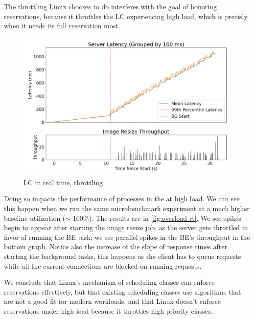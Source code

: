 The throttling Linux chooses to do interferes with the goal of honoring
reservations, because it throttles the LC experiencing high load, which is
precisly when it needs its full reservation  most.


\begin{figure}[t]
    \centering
    \includegraphics[width=\columnwidth]{graphs/overload-rt.png}
    \caption{LC in real time, throttling}\label{fig:overload-rt}
\end{figure}

Doing so impacts the performance of processes in the \rtclass{} at high load. We
can see this happen when we run the same microbenchmark experiment at a much
higher baseline utilization ($\sim$ 100\%). The results are in
\autoref{fig:overload-rt}. We see spikes begin to appear after starting the
image resize job, as the \rtclass{} server gets throttled in favor of running
the BE task; we see parallel spikes in the BE's throughput in the bottom graph.
Notice also the increase of the slope of response times after starting the
background tasks, this happens as the client has to queue requests while all the
current connections are blocked on running requests.

We conclude that Linux's mechanism of scheduling classes can enforce
reservations effectively, but that existing scheduling classes use algorithms
that are not a good fit for modern workloads, and that Linux doesn't enforce
reservations under high load because it throttles high priority classes.






